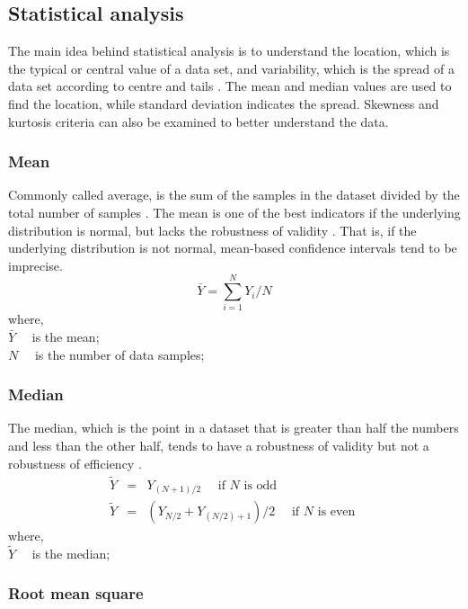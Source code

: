 \subsection{Statistical analysis}

The main idea behind statistical analysis is to understand the location, which is the typical or central value of a data set, and variability, which is the spread of a data set according to centre and tails \cite{croarkin2012handbook}. The mean and median values are used to find the location, while standard deviation indicates the spread. Skewness and kurtosis criteria can also be examined to better understand the data. 

\subsubsection{Mean}

Commonly called average, is the sum of the samples in the dataset divided by the total number of samples \cite{shukla2015analysis}. The mean is one of the best indicators if the underlying distribution is normal, but lacks the robustness of validity \cite{croarkin2012handbook}. That is, if the underlying distribution is not normal, mean-based confidence intervals tend to be imprecise.
\begin{equation}
\bar{Y}=\sum_{i=1}^{N} Y_{i} / N
\label{mean}
\end{equation}
where,\\
$\bar{Y} \quad$ is the mean;\\
$N \quad$ is the number of data samples;
\pagebreak
\subsubsection{Median}

The median, which is the point in a dataset that is greater than half the numbers and less than the other half, tends to have a robustness of validity but not a robustness of efficiency \cite{croarkin2012handbook,shukla2015analysis}.
\begin{eqnarray}
\tilde{Y} &=& Y_{(N+1) / 2} \quad \text { if } N \text { is odd }\\
\tilde{Y} &=& \left(Y_{N / 2}+Y_{(N / 2)+1}\right) / 2 \quad \text { if } N \text { is even }
\label{median}
\end{eqnarray}
where,\\
$\tilde{Y} \quad$ is the median;
\subsubsection{Root mean square}

